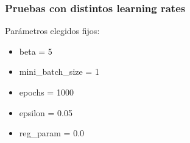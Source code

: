 
\subsubsection{Pruebas con distintos learning rates}

Parámetros elegidos fijos:

\begin{itemize}
\item beta = 5
\item mini\_batch\_size = 1
\item epochs = 1000
\item epsilon = 0.05
\item reg\_param = 0.0
\end{itemize}


